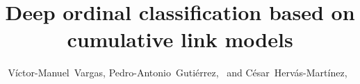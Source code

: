 \documentclass[journal]{IEEEtran}
\begin{document}
	\title{Deep ordinal classification based on cumulative link models}
	
	\author{Víctor-Manuel~Vargas, Pedro-Antonio~Gutiérrez,~ and César~Hervás-Mart\'inez,~}
	
	
	
	
	\markboth{}%
	{}
	
\end{document}
